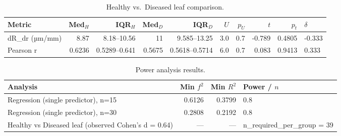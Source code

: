 \begin{table}[htbp]
\centering
\caption{Healthy vs.\ Diseased leaf comparison.}
\label{tab:leaf}
\begin{tabular}{l rr rr rr rr l}
\toprule
Metric & Med$_H$ & IQR$_H$ & Med$_D$ & IQR$_D$ & $U$ & $p_U$ & $t$ & $p_t$ & $\delta$ \\
\midrule
dR_dr (µm/mm) & 8.87 & 8.18–10.56 & 11 & 9.585–13.25 & 3.0 & 0.7 & -0.789 & 0.4805 & -0.333 \\
Pearson r & 0.6236 & 0.5289–0.641 & 0.5675 & 0.5618–0.5714 & 6.0 & 0.7 & 0.083 & 0.9413 & 0.333 \\
\bottomrule
\end{tabular}
\end{table}

\begin{table}[htbp]
\centering
\caption{Power analysis results.}
\label{tab:power}
\begin{tabular}{l rr l}
\toprule
Analysis & Min $f^2$ & Min $R^2$ & Power / $n$ \\
\midrule
Regression (single predictor), n=15 & 0.6126 & 0.3799 & 0.8 \\
Regression (single predictor), n=30 & 0.2808 & 0.2192 & 0.8 \\
Healthy vs Diseased leaf (observed Cohen's d = 0.64) & — & — & n_required_per_group = 39 \\
\bottomrule
\end{tabular}
\end{table}

